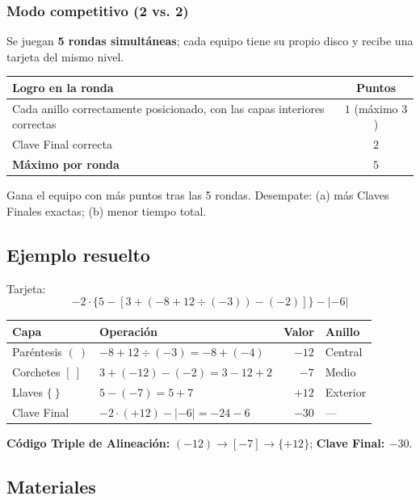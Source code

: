 \documentclass[12pt, letterpaper]{article}
\newcommand{\abs}[1]{\lvert #1\rvert}
\begin{document}
\subsubsection{Modo competitivo (2 vs. 2)}

Se juegan \textbf{5 rondas simultáneas}; cada equipo tiene su propio disco y recibe una tarjeta del mismo nivel.

\begin{center}
\small
\begin{tabular}{@{}l c@{}}
\toprule
\textbf{Logro en la ronda} & \textbf{Puntos}\\
\midrule
Cada anillo correctamente posicionado, con las capas interiores correctas & $1$ (máximo $3$)\\
Clave Final correcta & $2$\\
\textbf{Máximo por ronda} & $5$\\
\bottomrule
\end{tabular}
\end{center}

Gana el equipo con más puntos tras las 5 rondas. Desempate: (a) más Claves Finales exactas; (b) menor tiempo total.

\subsection{Ejemplo resuelto}

Tarjeta:
\[
-2\cdot\{5-[3+(-8+12\div(-3))-(-2)]\}-\abs{-6}
\]

\begin{center}
\small
\begin{tabular}{@{}l l r l@{}}
\toprule
\textbf{Capa} & \textbf{Operación} & \textbf{Valor} & \textbf{Anillo}\\
\midrule
Paréntesis $(~)$ & $-8+12\div(-3)=-8+(-4)$ & $-12$ & Central\\
Corchetes $[~]$ & $3+(-12)-(-2)=3-12+2$ & $-7$ & Medio\\
Llaves $\{~\}$ & $5-(-7)=5+7$ & $+12$ & Exterior\\
Clave Final & $-2\cdot(+12)-\abs{-6}=-24-6$ & $-30$ & ---\\
\bottomrule
\end{tabular}
\end{center}

\textbf{Código Triple de Alineación:} $(-12)\rightarrow[-7]\rightarrow\{+12\}$; \textbf{Clave Final: $-30$}.

\subsection{Materiales}
\end{document}
